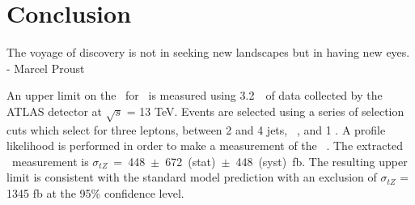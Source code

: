 \chapter{Conclusion}
\label{SECTION-CONCLUSION}

The voyage of discovery is not in seeking new landscapes but in having new eyes. - Marcel Proust

\vspace{5mm} %

An upper limit on the \xs~for \tz~is measured using 3.2~\fb~of data collected by the ATLAS detector at $\sqrt{s}$ = 13 TeV. Events are selected using a series of selection cuts which select for three leptons, between 2 and 4 jets, \met~, and 1 \btag. A profile likelihood is performed in order to make a measurement of the \tz~\xs. The extracted \xs~measurement is $\sigma_{tZ}$~=~448~$\pm$~672~(stat)~$\pm$~448~(syst)~fb. The resulting upper limit is consistent with the standard model prediction  with an exclusion of $\sigma_{tZ}$ = 1345 fb at the 95\% confidence level. 

   


 

